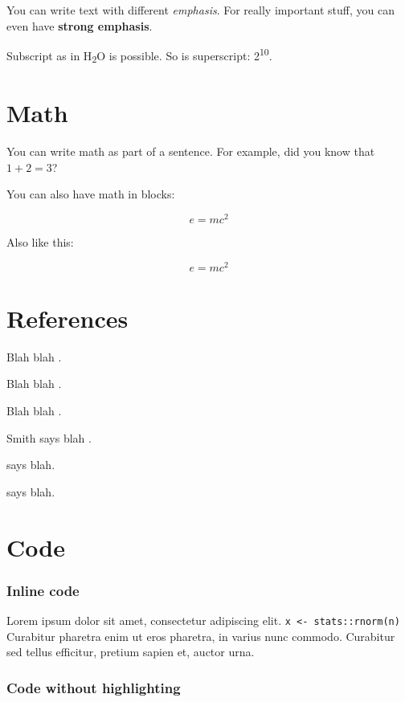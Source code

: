 \documentclass{article}
\begin{document}
You can write text with different \emph{emphasis}. For really important
stuff, you can even have \textbf{strong emphasis}.

Subscript as in H\textsubscript{2}O is possible. So is superscript:
2\textsuperscript{10}.

\section{Math}

You can write math as part of a sentence. For example, did you know that
$1+2=3$?

You can also have math in blocks:

$$e = mc^2$$

Also like this:

\begin{equation}
e = mc^2
\end{equation}

\section{References}

Blah blah \citetext{\citealp[see][pp.~33-35]{doe99}; \citealp[also][chap. 1]{smith04}}.

Blah blah \citep[pp.~33-35 and 38-39]{doe99}.

Blah blah \citep{smith04, doe99}.

Smith says blah \citeyearpar{smith04}.

\citet{smith04} says blah.

\citet[p.~33]{smith04} says blah.

\section{Code}

\subsubsection{Inline code}

Lorem ipsum dolor sit amet, consectetur adipiscing elit.
\lstinline!x <- stats::rnorm(n)! Curabitur pharetra enim ut eros
pharetra, in varius nunc commodo. Curabitur sed tellus efficitur,
pretium sapien et, auctor urna.

\subsubsection{Code without highlighting}
\end{document}
